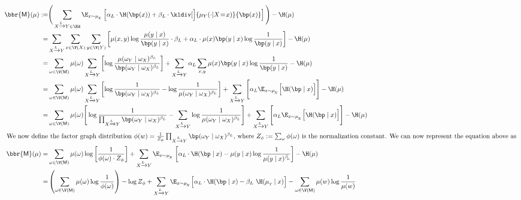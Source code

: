 \documentclass{article}
\newcommand{\sfM}{\mathsf M}
\newcommand{\alle}[1][L]{_{ X \xrightarrow{\!\!#1} Y }}
\begin{document}
	\begin{align*}
		\bbr{\sfM}(\mu) :=& \Bigg(\sum_{ X \xrightarrow{\!\!L} Y  \in \Ed } \E_{x \sim \mu_{\!_X}}  \left[ \alpha_L\cdot \H (\bp (x)) + \beta_L \cdot \kldiv[\Big]{ \mu_Y(\cdot | X \!=\! x) }{\bp(x) }  \right] \Bigg) - \H(\mu) \\
		=& \sum_{ X \xrightarrow{\!\!L} Y } \sum_{x \in \V(X)} \sum_{y \in \V(Y)}  \left[
			\mu(x,y) \log \frac{\mu(y \mid x)}{\bp(y \mid x)}\cdot \beta_L
			+ \alpha_L \cdot \mu(x) \bp(y \mid x) \log \frac{1}{\bp(y \mid x)} \right]  - \H(\mu) \\
%
%
		=& \sum_{\omega \in \V(\sfM)} \mu(\omega) \sum\alle \left[
			\log \frac{\mu(\omega_Y \mid \omega_X)^{\beta_L}}{\bp(\omega_Y \mid \omega_X)^{\beta_L}}
			\right] + \sum\alle \alpha_L \sum_{x,y} \mu(x) \bp(y \mid x) \log \frac{1}{\bp(y \mid x)}   - \H(\mu) \\
%
		=& \sum_{\omega \in \V(\sfM)} \mu(\omega) \sum\alle \left[
			\log \frac{1}{\bp(\omega_Y \mid \omega_X)^{\beta_L} } - \log \frac{1}{\mu(\omega_Y \mid \omega_X)^{\beta_L}}
			\right] + \sum\alle \Bigg[\alpha_L \E_{x \sim \mu_{\!_X}} \Big[ \H(\bp \mid x) \Big] \Bigg]- \H(\mu) \\
%
		=& \sum_{\omega \in \V(\sfM)} \mu(\omega) \Bigg[
			\log \frac{1}{\prod\alle\bp(\omega_Y \mid \omega_X)^{\beta_L} } - \sum\alle \log \frac{1}{\mu(\omega_Y \mid \omega_X)^{\beta_L}}
			\Bigg] + \sum\alle \Bigg[\alpha_L \E_{x \sim \mu_{\!_X}} \Big[ \H(\bp \mid x) \Big] \Bigg]- \H(\mu) \\
%
	\intertext{
	We now define the factor graph distribution $\phi(w) = \frac{1}{Z_{\phi}}\prod\alle \bp(\omega_Y \mid \omega_X)^{\beta_L}$, where $Z_\phi := \sum_{\omega} \phi(\omega)$ is the normalization constant. We can now represent the equation above as }
%
		\bbr{\sfM}(\mu) =& \sum_{\omega \in \V(\sfM)} \mu(\omega) \log \left[
			\frac{1}{\phi(\omega) \cdot Z_\phi}
			\right] + \sum\alle \E_{x \sim \mu_{\!_X}} \left[ \alpha_L \cdot \H(\bp \mid x) - \mu(y \mid x) \log \frac{1}{\mu(y \mid x)^{\beta_{\!_L}\!}} \right]  - \H(\mu) \\
%
		=& \left(\sum_{\omega \in \V(\sfM)} \mu(\omega) \log \frac{1}{\phi(\omega) }\right) - \log Z_\phi +
			\sum\alle \E_{x \sim \mu_{\!_X}} \Big[ \alpha_L \cdot \H(\bp \mid x) - \beta_L \ \H(\mu_{_Y}\! \mid x) \Big] -\sum_{\omega \in \V(\sfM)} \mu(w) \log \frac{1}{\mu(w)}  \\

\end{align*}
\end{document}
